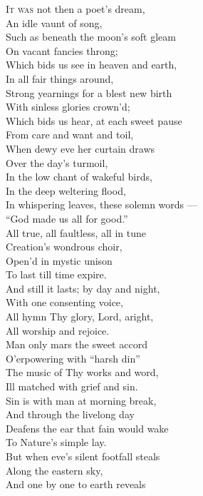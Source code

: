 \textsc{It was} not then a poet’s dream, \\
 An idle vaunt of song, \\
 Such as beneath the moon’s soft gleam \\
 On vacant fancies throng; \\
  Which bids us see in heaven and earth, \\
 In all fair things around, \\
 Strong yearnings for a blest new birth \\
 With sinless glories crown’d; \\
  Which bids us hear, at each sweet pause \\
 From care and want and toil, \\
 When dewy eve her curtain draws \\
 Over the day’s turmoil, \\
  In the low chant of wakeful birds, \\
 In the deep weltering flood, \\
 In whispering leaves, these solemn words — \\
 “God made us all for good.” \\
  All true, all faultless, all in tune \\
 Creation’s wondrous choir, \\
 Open’d in mystic unison \\
 To last till time expire. \\
  And still it lasts; by day and night, \\
 With one consenting voice, \\
 All hymn Thy glory, Lord, aright, \\
 All worship and rejoice. \\
  Man only mars the sweet accord \\
 O’erpowering with “harsh din” \\
 The music of Thy works and word, \\
 Ill matched with grief and sin. \\
  Sin is with man at morning break, \\
 And through the livelong day \\
 Deafens the ear that fain would wake \\
 To Nature’s simple lay. \\
  But when eve’s silent footfall steals \\
 Along the eastern sky, \\
 And one by one to earth reveals \\
